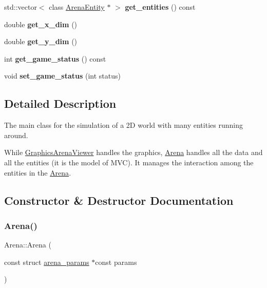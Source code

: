 \begin{DoxyCompactItemize}
std\+::vector$<$ class \mbox{\hyperlink{class_arena_entity}{Arena\+Entity}} $\ast$ $>$ {\bfseries get\+\_\+entities} () const
\item 
\mbox{\label{class_arena_a5e3be20f2c67338a5a684b85a66f6b96}} 
double {\bfseries get\+\_\+x\+\_\+dim} ()
\item 
\mbox{\label{class_arena_a35737d65ff32f2bd5871f0bdfbc10a85}} 
double {\bfseries get\+\_\+y\+\_\+dim} ()
\item 
\mbox{\label{class_arena_a4d599cccea003b9c60ddb39535c058f4}} 
int {\bfseries get\+\_\+game\+\_\+status} () const
\item 
\mbox{\label{class_arena_ac8e8b3438db02aa5395f7fcb537ed952}} 
void {\bfseries set\+\_\+game\+\_\+status} (int status)
\end{DoxyCompactItemize}


\subsection{Detailed Description}
The main class for the simulation of a 2D world with many entities running around. 

While \mbox{\hyperlink{class_graphics_arena_viewer}{Graphics\+Arena\+Viewer}} handles the graphics, \mbox{\hyperlink{class_arena}{Arena}} handles all the data and all the entities (it is the model of M\+VC). It manages the interaction among the entities in the \mbox{\hyperlink{class_arena}{Arena}}. 

\subsection{Constructor \& Destructor Documentation}
\mbox{\label{class_arena_ac442d519facc5feebfd7612a53817e9a}} 
\subsubsection{\texorpdfstring{Arena()}{Arena()}}
{\footnotesize\ttfamily Arena\+::\+Arena (\begin{DoxyParamCaption}\item[{const struct \mbox{\hyperlink{structarena__params}{arena\+\_\+params}} $\ast$const}]{params }\end{DoxyParamCaption})\hspace{0.3cm}{\ttfamily [explicit]}}



